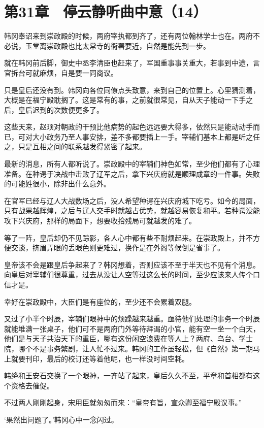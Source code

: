 \section{第31章　停云静听曲中意（14）}

韩冈奉诏来到崇政殿的时候，两府宰执都到齐了，还有两位翰林学士也在。两府不必说，玉堂离崇政殿也比太常寺的衙署要近，自然是能先到一步。

就在韩冈前后脚，御史中丞李清臣也赶来了，军国重事事关重大，若事到中途，言官拆台可就麻烦，自是要一同商议。

只是皇后还没有到。韩冈向各位同僚点头致意，来到自己的位置上。心里猜测着，大概是在福宁殿耽搁了。这是常有的事，之前就很常见，自从天子能动一下手之后，皇后迟到的次数便更多了。

这些天来，赵顼对朝政的干预比他病势的起色远远要大得多，依然只是能动动手而已，可对大小政务乃至人事安排，差不多都要插上一手。宰辅们基本上都是听之任之，只是互相之间的联系越发得紧密了起来。

最新的消息，所有人都听说了。崇政殿中的宰辅们神色如常，至少他们都有了心理准备。在种谔于决战中击败了辽军之后，拿下兴庆府就是顺理成章的一件事。失败的可能姓很小，除非出什么意外。

在官军已经与辽人大战数场之后，没人希望种谔在兴庆府城下吃亏。如今的局面，只有战果越辉煌，之后与辽人交手时就越占优势，就越容易恢复和平。若种谔没能攻下兴庆府，那样的局面下，想要收拾残局可就越发的难了。

等了一阵，皇后却仍不见踪影，各人心中都有些不耐烦起来。在崇政殿上，并不方便交谈，挤眉弄眼的丢眼色则更难过，换作是在外阁等候倒是省事了。

皇帝该不会是跟皇后争起来了？韩冈想着，否则应该不至于半天也不见有个消息。向皇后对宰辅们很尊重，过去从没让人空等过这么长的时间，至少应该来人传个口信才是。

幸好在崇政殿中，大臣们是有座位的，至少还不会累着双腿。

又过了小半个时辰，宰辅们眼神中的烦躁越来越重。亟待他们处理的事务一个时辰就能堆满一张桌子，他们可不是两府门外等待拜谒的小官，能有空一坐一个白天，他们是与天子共治天下的重臣，哪有这份闲空浪费在等人上？两府、乌台、学士院，哪个不是事务繁剧，让人忙不过来。韩冈的工作虽轻松，但《自然》第一期马上就要刊印，最后的校订还等着他呢，也一样没时间空耗。

韩绛和王安石交换了一个眼神，一齐站了起来，皇后久久不至，平章和首相都有这个资格去催促。

不过两人刚刚起身，宋用臣就匆匆而来：“皇帝有旨，宣众卿至福宁殿议事。”

‘果然出问题了。’韩冈心中一念闪过。

